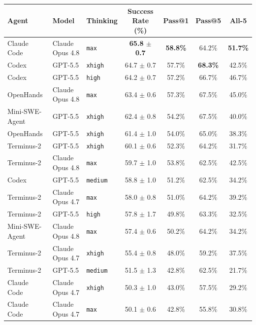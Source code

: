 \documentclass{llmxive}
\providecommand{\arraystretch}{1.15}
\begin{document}
\begin{table}[t]
\centering
\small
\setlength{\tabcolsep}{8pt}
\renewcommand{\arraystretch}{1.05}
\begin{tabular}{l l l c c c c}
\toprule
Agent & Model & Thinking & Success Rate (\%) & Pass@1 & Pass@5 & All-5 \\
\midrule
Claude Code    & Claude Opus 4.8           & \texttt{max}    & \textbf{65.8 $\pm$ 0.7} & \textbf{58.8\%} & 64.2\% & \textbf{51.7\%} \\
Codex          & GPT-5.5                   & \texttt{xhigh}  & 64.7 $\pm$ 0.7 & 57.7\% & \textbf{68.3\%} & 42.5\% \\
Codex          & GPT-5.5                   & \texttt{high}   & 64.2 $\pm$ 0.7 & 57.2\% & 66.7\% & 46.7\% \\
OpenHands      & Claude Opus 4.8           & \texttt{max}    & 63.4 $\pm$ 0.6 & 57.3\% & 67.5\% & 45.0\% \\
Mini-SWE-Agent & GPT-5.5                   & \texttt{xhigh}  & 62.4 $\pm$ 0.8 & 54.2\% & 67.5\% & 40.0\% \\
OpenHands      & GPT-5.5                   & \texttt{xhigh}  & 61.4 $\pm$ 1.0 & 54.0\% & 65.0\% & 38.3\% \\
Terminus-2     & GPT-5.5                   & \texttt{xhigh}  & 60.1 $\pm$ 0.6 & 52.3\% & 64.2\% & 31.7\% \\
Terminus-2     & Claude Opus 4.8           & \texttt{max}    & 59.7 $\pm$ 1.0 & 53.8\% & 62.5\% & 42.5\% \\
Codex          & GPT-5.5                   & \texttt{medium} & 58.8 $\pm$ 1.0 & 51.2\% & 62.5\% & 34.2\% \\
Terminus-2     & Claude Opus 4.7           & \texttt{max}    & 58.0 $\pm$ 0.8 & 51.0\% & 64.2\% & 39.2\% \\
Terminus-2     & GPT-5.5                   & \texttt{high}   & 57.8 $\pm$ 1.7 & 49.8\% & 63.3\% & 32.5\% \\
Mini-SWE-Agent & Claude Opus 4.8           & \texttt{max}    & 57.4 $\pm$ 0.6 & 50.2\% & 64.2\% & 34.2\% \\
Terminus-2     & Claude Opus 4.7           & \texttt{xhigh}  & 55.4 $\pm$ 0.8 & 48.0\% & 59.2\% & 37.5\% \\
Terminus-2     & GPT-5.5                   & \texttt{medium} & 51.5 $\pm$ 1.3 & 42.8\% & 62.5\% & 21.7\% \\
Claude Code    & Claude Opus 4.7           & \texttt{xhigh}  & 50.3 $\pm$ 1.0 & 43.0\% & 57.5\% & 29.2\% \\
Claude Code    & Claude Opus 4.7           & \texttt{max}    & 50.1 $\pm$ 0.6 & 42.8\% & 55.8\% & 30.8\% \\

\end{tabular}
\end{table}
\end{document}
